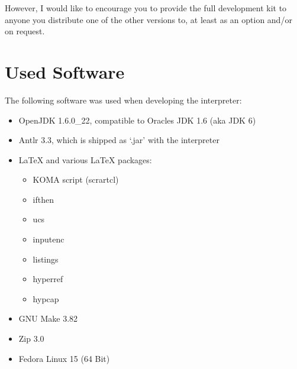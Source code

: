 However, I would like to encourage you to provide the full development kit to anyone you distribute one of the other versions to, at least as an option and\slash{}or on request.

\section{Used Software}

The following software was used when developing the \setlX{} interpreter:

\begin{itemize}
	\item OpenJDK 1.6.0\_22, compatible to Oracles JDK 1.6 (aka JDK 6)
	\item Antlr 3.3, which is shipped as `.jar' with the interpreter
	\item \LaTeX{} and various \LaTeX{} packages:
		\begin{itemize}
			\item KOMA script (scrartcl)
			\item ifthen
			\item ucs
			\item inputenc
			\item listings
			\item hyperref
			\item hypcap
		\end{itemize}
	\item GNU Make 3.82
	\item Zip 3.0
	\item Fedora Linux 15 (64 Bit)
\end{itemize}


